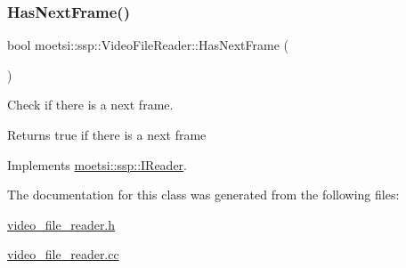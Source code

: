 \mbox{\label{classmoetsi_1_1ssp_1_1VideoFileReader_ab5733b56b6d6dd7596eac9d914481c7e}} 
\subsubsection{\texorpdfstring{Has\+Next\+Frame()}{HasNextFrame()}}
{\footnotesize\ttfamily bool moetsi\+::ssp\+::\+Video\+File\+Reader\+::\+Has\+Next\+Frame (\begin{DoxyParamCaption}{ }\end{DoxyParamCaption})\hspace{0.3cm}{\ttfamily [virtual]}}



Check if there is a next frame. 

\begin{DoxyReturn}{Returns}
true if there is a next frame 
\end{DoxyReturn}


Implements \hyperlink{classmoetsi_1_1ssp_1_1IReader_af9186ba41e136dc4ec3242b5dd55fa04}{moetsi\+::ssp\+::\+I\+Reader}.



The documentation for this class was generated from the following files\+:\begin{DoxyCompactItemize}
\item 
\hyperlink{video__file__reader_8h}{video\+\_\+file\+\_\+reader.\+h}\item 
\hyperlink{video__file__reader_8cc}{video\+\_\+file\+\_\+reader.\+cc}\end{DoxyCompactItemize}

